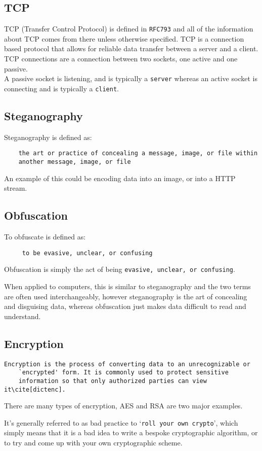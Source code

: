 \subsection{TCP}
TCP (Transfer Control Protocol) is defined in \texttt{RFC793}\cite{rfc793} and all of the information about TCP comes from there unless otherwise specified.
TCP is a connection based protocol that allows for reliable data transfer between a server and a client.\\
TCP connections are a connection between two sockets, one active and one passive.\\
A passive socket is listening, and is typically a \texttt{server} whereas an active socket is connecting and is typically a \texttt{client}.

\subsection{Steganography}
Steganography is defined as\cite{dictsteno}:
\begin{verbatim}
    the art or practice of concealing a message, image, or file within
    another message, image, or file
\end{verbatim}
An example of this could be encoding data into an image, or into a HTTP stream.

\subsection{Obfuscation}
To obfuscate is defined as\cite{dictobfs}:
\begin{verbatim}
     to be evasive, unclear, or confusing
\end{verbatim}
Obfuscation is simply the act of being \texttt{evasive, unclear, or confusing}.\par
When applied to computers, this is similar to steganography and the two terms are often used interchangeably, however steganography is the art of concealing and disguising data, whereas obfuscation just makes data difficult to read and understand. 

\subsection{Encryption}
\begin{Verbatim}[commandchars=\\\[\]]
    Encryption is the process of converting data to an unrecognizable or
    `encrypted' form. It is commonly used to protect sensitive
    information so that only authorized parties can view it\cite[dictenc].
\end{Verbatim}
There are many types of encryption, AES and RSA are two major examples.\par
It's generally referred to as bad practice to `\texttt{roll your own crypto}'\cite{memtocrypto}, which simply means that it is a bad idea to write a bespoke cryptographic algorithm, or to try and come up with your own cryptographic scheme.

